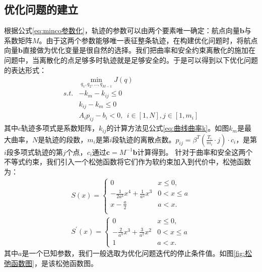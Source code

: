 \documentclass[master,academic]{ysuthesis} %
\begin{document}
		\subsection{优化问题的建立}
		根据公式\ref{eq:minco参数化}，轨迹的参数可以由两个要素唯一确定：航点向量$\mathbf{b}$与系数矩阵$M$。由于这两个参数能够唯一表征整条轨迹，在构建优化问题时，将航点向量$\mathbf{b}$直接做为优化变量是很自然的选择。我们把曲率和安全约束离散化的施加在问题中，当离散化的点足够多时轨迹就是足够安全的。于是可以得到以下优化问题的表达形式：
		\begin{equation}
			\begin{aligned}
				&\min_{q_1,q_2,...,q_{M-1}} J( q ) \\
				s.t.&-k_{m}-k_{ij}\le 0\\
				&k_{ij}-k_{m}\le 0 \\
				&A_ip_{ij}-b_i<0,\ \ i\in \left[ 1,N \right] ,j\in \left[ 1,m_i \right] 
			\end{aligned}
		\end{equation}
		其中$c$轨迹多项式是系数矩阵，$k_{ij}$的计算方法见公式\ref{eq:曲线曲率k}。如图$k_{m}$是最大曲率，$N$是轨迹的段数，$m_i$是第$i$段轨迹的离散点数。$p_{ij}=\beta^T(\frac{T_i}{m_i}\cdot j)\cdot c_i$，是第$i$段多项式轨迹的第$j$个点，$c_i$通过$\mathbf{c} = M^{-1}\mathbf{b}$计算得到。
		针对于曲率和安全这两个不等式约束，我们引入一个松弛函数将它们作为软约束加入到代价中，松弛函数为：
		\begin{equation}
			\begin{aligned}
				S( x ) =\left\{ \begin{matrix}
					0&		x\le 0,\\
					-\frac{1}{2a^3}x^4+\frac{1}{a^2}x^3&		0<x\le a\\
					x-\frac{a}{2}&		a<x.\\
				\end{matrix} \right.  \\
					S^{'}(x) = \left\{\begin{matrix}
					0& x\le0, \\
					-\frac{2}{a^3}x^3+\frac{3}{a^2}x^2& 0 < x \le a \\
					1& a < x.
				\end{matrix}\right.
			\end{aligned}
		\end{equation}
		其中$a$是一个已知参数，我们一般选取为优化问题迭代的停止条件值。如图\ref{fig:松弛函数图}，是该松弛函数图。
\end{document}
